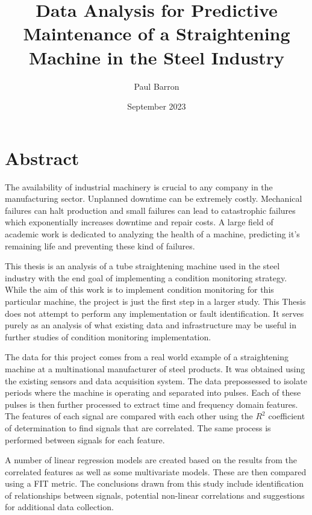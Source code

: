 \documentclass{article}
\title{Data Analysis for Predictive Maintenance of a Straightening Machine in the Steel Industry}
\date{September 2023}
\author{Paul Barron}
\begin{document}
\maketitle
\newpage
{}
\tableofcontents
\newpage

\pagestyle{plain}

\section{Abstract}
The availability of industrial machinery  is crucial to any company in the manufacturing sector. Unplanned downtime can be extremely costly. Mechanical failures can halt production and small failures can lead to catastrophic failures which exponentially increases downtime and repair costs. A large field of academic work is dedicated to analyzing the health of a machine, predicting it's remaining life and preventing these kind of failures.

This thesis is an analysis of a tube straightening machine used in the steel industry with the end goal of implementing a condition monitoring strategy. While the aim of this work is to implement condition monitoring for this particular machine, the project is just the first step in a larger study. This Thesis does not attempt to perform any implementation or fault identification. It serves purely as an analysis of what existing data and infrastructure may be useful in further studies of condition monitoring implementation.

The data for this project comes from a real world example of a straightening machine at a multinational manufacturer of steel products. It was obtained using the existing sensors and data acquisition system. The data prepossessed to isolate periods where the machine is operating and separated into pulses. Each of these pulses is then further processed to extract time and frequency domain features. The features of each signal are compared with each other using the $R^{2}$ coefficient of determination to find signals that are correlated. The same process is performed between signals for each feature. 

A number of linear regression models are created based on the results from the correlated features as well as some multivariate models. These are then compared using a FIT metric. The conclusions drawn from this study include identification of relationships between signals, potential non-linear correlations and suggestions for additional data collection.
\clearpage
\end{document}

